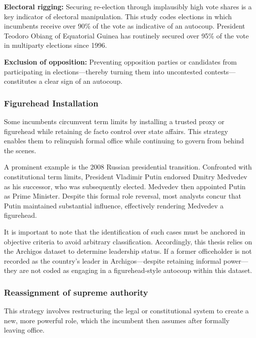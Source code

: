 \documentclass[
  12pt,
]{report}
\begin{document}
\textbf{Electoral rigging:} Securing re-election through implausibly
high vote shares is a key indicator of electoral manipulation. This
study codes elections in which incumbents receive over 90\% of the vote
as indicative of an autocoup. President Teodoro Obiang of Equatorial
Guinea has routinely secured over 95\% of the vote in multiparty
elections since 1996.

\textbf{Exclusion of opposition:} Preventing opposition parties or
candidates from participating in elections---thereby turning them into
uncontested contests---constitutes a clear sign of an autocoup.

\subsubsection*{Figurehead Installation}\label{figurehead-installation}

Some incumbents circumvent term limits by installing a trusted proxy or
figurehead while retaining de facto control over state affairs. This
strategy enables them to relinquish formal office while continuing to
govern from behind the scenes.

A prominent example is the 2008 Russian presidential transition.
Confronted with constitutional term limits, President Vladimir Putin
endorsed Dmitry Medvedev as his successor, who was subsequently elected.
Medvedev then appointed Putin as Prime Minister. Despite this formal
role reversal, most analysts concur that Putin maintained substantial
influence, effectively rendering Medvedev a figurehead.

It is important to note that the identification of such cases must be
anchored in objective criteria to avoid arbitrary classification.
Accordingly, this thesis relies on the Archigos dataset to determine
leadership status. If a former officeholder is not recorded as the
country's leader in Archigos---despite retaining informal power---they
are not coded as engaging in a figurehead-style autocoup within this
dataset.

\subsubsection*{Reassignment of supreme
authority}\label{reassignment-of-supreme-authority}

This strategy involves restructuring the legal or constitutional system
to create a new, more powerful role, which the incumbent then assumes
after formally leaving office.
\end{document}
